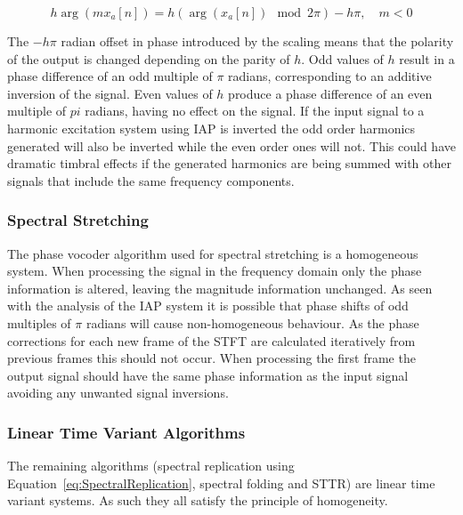 			\begin{equation}
				h\arg(mx_{a}[n]) = h(\arg(x_{a}[n]) \mod 2\pi) - h\pi, \quad m < 0
				\label{eq:IAPOrderHomogeneity}
			\end{equation}

			The $-h\pi$ radian offset in phase introduced by the scaling means that the polarity of the output
			is changed depending on the parity of $h$. Odd values of $h$ result in a phase difference of an odd
			multiple of $\pi$ radians, corresponding to an additive inversion of the signal. Even values of $h$
			produce a phase difference of an even multiple of $pi$ radians, having no effect on the signal. If
			the input signal to a harmonic excitation system using IAP is inverted the odd order harmonics
			generated will also be inverted while the even order ones will not. This could have dramatic
			timbral effects if the generated harmonics are being summed with other signals that include the
			same frequency components.

		\subsubsection*{Spectral Stretching}
			The phase vocoder algorithm used for spectral stretching is a homogeneous system. When processing
			the signal in the frequency domain only the phase information is altered, leaving the magnitude
			information unchanged. As seen with the analysis of the IAP system it is possible that phase shifts
			of odd multiples of $\pi$ radians will cause non-homogeneous behaviour. As the phase corrections
			for each new frame of the STFT are calculated iteratively from previous frames this should not
			occur. When processing the first frame the output signal should have the same phase information as
			the input signal avoiding any unwanted signal inversions.

		\subsubsection*{Linear Time Variant Algorithms}
			The remaining algorithms (spectral replication using Equation~\ref{eq:SpectralReplication},
			spectral folding and STTR) are linear time variant systems. As such they all satisfy the principle
			of homogeneity.


